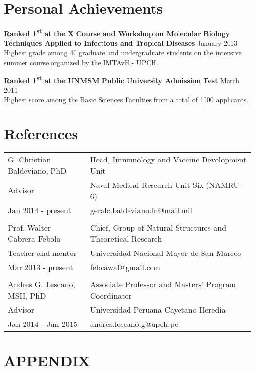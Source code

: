 \documentclass[margin,line]{res}
\begin{document}
\begin{resume}
\section{\sc Personal Achievements}

{\bf Ranked 1\textsuperscript{st} at the X Course and Workshop on Molecular Biology \\Techniques Applied to Infectious and Tropical Diseases} \hfill January 2013\\
Highest grade among 40 graduate and undergraduate students on the intensive summer course organized by the IMTAvH - UPCH.

{\bf Ranked 1\textsuperscript{st} at the UNMSM Public University Admission Test} \hfill March 2011\\
Highest score among the Basic Sciences Faculties from a total of 1000 applicants.\\%



\section{\sc References }

\begin{tabular}{ l l }
	G. Christian Baldeviano, PhD & Head, Immunology and Vaccine Development Unit \\
	Advisor & Naval Medical Research Unit Six (NAMRU-6)\\
	Jan 2014 - present & geralc.baldeviano.fn@mail.mil\\
	&\\
	Prof. Walter Cabrera-Febola & Chief, Group of Natural Structures and Theoretical Research \\
	Teacher and mentor & Universidad Nacional Mayor de San Marcos\\
	Mar 2013 - present & febcawal@gmail.com\\
	&\\
	Andres G. Lescano, MSH, PhD & Associate Professor and Masters' Program Coordinator\\
	Advisor & Universidad Peruana Cayetano Heredia\\
	Jan 2014 - Jun 2015 & andres.lescano.g@upch.pe\\
\end{tabular}

\newpage

\section{\scshape APPENDIX }


\end{resume}
\end{document}
